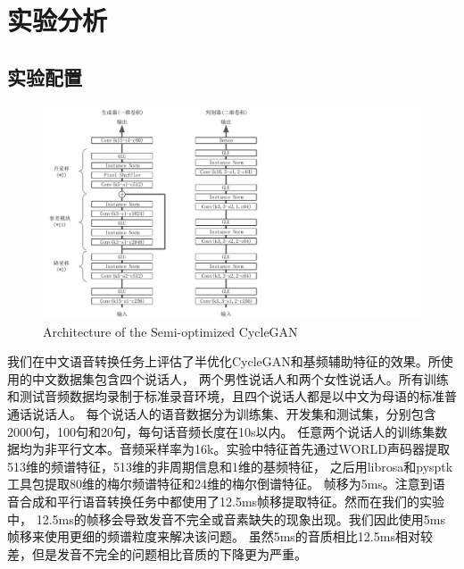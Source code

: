 \section{实验分析}
\subsection{实验配置}

\begin{figure}[!htp]
    \centering
    \includegraphics[width=12cm,trim=0 0 250 0,clip]{figure/4_networks.pdf}
    {Architecture of the Semi-optimized CycleGAN}
    \label{fig:networks}
\end{figure}

我们在中文语音转换任务上评估了半优化CycleGAN和基频辅助特征的效果。所使用的中文数据集包含四个说话人，
两个男性说话人和两个女性说话人。所有训练和测试音频数据均录制于标准录音环境，且四个说话人都是以中文为母语的标准普通话说话人。
每个说话人的语音数据分为训练集、开发集和测试集，分别包含2000句，100句和20句，每句话音频长度在10s以内。
任意两个说话人的训练集数据均为非平行文本。音频采样率为16k。实验中特征首先通过WORLD声码器提取513维的频谱特征，513维的非周期信息和1维的基频特征，
之后用librosa\cite{mcfee2015librosa}和pysptk\cite{yamamoto2019r9y9}工具包提取80维的梅尔频谱特征和24维的梅尔倒谱特征。
帧移为5ms。注意到语音合成和平行语音转换任务中都使用了12.5ms帧移提取特征。然而在我们的实验中，
12.5ms的帧移会导致发音不完全或音素缺失的现象出现。我们因此使用5ms帧移来使用更细的频谱粒度来解决该问题。
虽然5ms的音质相比12.5ms相对较差，但是发音不完全的问题相比音质的下降更为严重。

